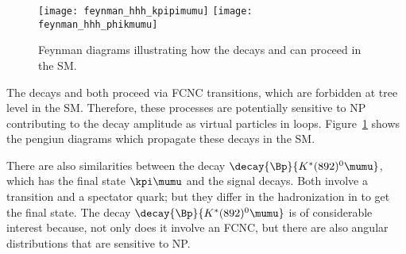 


\begin{figure}
  \begin{center}
    \texttt{[image: feynman\_hhh\_kpipimumu]}
    \texttt{[image: feynman\_hhh\_phikmumu]}
    \caption[Feynman diagrams for \btokpipimumu and \btophikmumu]
    {\small
      Feynman diagrams illustrating how the decays \btokpipimumu and \btophikmumu can proceed in
      the SM.
    }
    \label{fig:hhh:feyn}
  \end{center}
\end{figure}


The decays \btokpipimumu and \btophikmumu both proceed via \decay{\bquark}{\squark\mumu} FCNC
transitions, which are forbidden at tree level in the SM.
Therefore, these processes are potentially sensitive to NP contributing
to the decay amplitude as virtual particles in loops.
Figure~\ref{fig:hhh:feyn} shows the pengiun diagrams which propagate these decays in the SM.

There are also similarities between the decay $\decay{\Bp}{K^*(892)^0\mumu}$, which has the final
state
$\kpi\mumu$ and the signal decays.
Both involve a \decay{\bquark}{\squark\mumu} transition and a spectator quark; but they differ in
the hadronization in to get the final state.
The decay $\decay{\Bp}{K^*(892)^0\mumu}$ is of considerable interest because, not only does it
involve an FCNC, but there are also angular distributions that are sensitive to NP.

